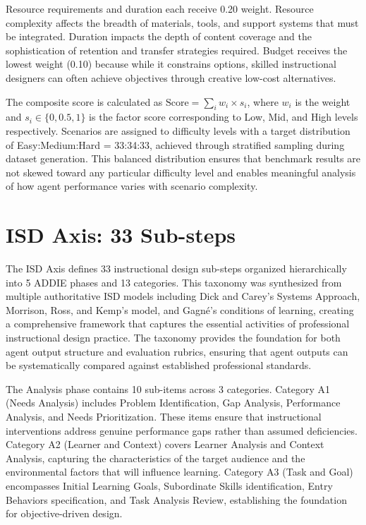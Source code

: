 Resource requirements and duration each receive 0.20 weight. Resource complexity affects the breadth of materials, tools, and support systems that must be integrated. Duration impacts the depth of content coverage and the sophistication of retention and transfer strategies required. Budget receives the lowest weight (0.10) because while it constrains options, skilled instructional designers can often achieve objectives through creative low-cost alternatives.

The composite score is calculated as $\text{Score} = \sum_{i} w_i \times s_i$, where $w_i$ is the weight and $s_i \in \{0, 0.5, 1\}$ is the factor score corresponding to Low, Mid, and High levels respectively. Scenarios are assigned to difficulty levels with a target distribution of Easy:Medium:Hard = 33:34:33, achieved through stratified sampling during dataset generation. This balanced distribution ensures that benchmark results are not skewed toward any particular difficulty level and enables meaningful analysis of how agent performance varies with scenario complexity.

\section{ISD Axis: 33 Sub-steps}
\label{app:isd-axis}

The ISD Axis defines 33 instructional design sub-steps organized hierarchically into 5 ADDIE phases and 13 categories. This taxonomy was synthesized from multiple authoritative ISD models including Dick and Carey's Systems Approach, Morrison, Ross, and Kemp's model, and Gagn\'e's conditions of learning, creating a comprehensive framework that captures the essential activities of professional instructional design practice. The taxonomy provides the foundation for both agent output structure and evaluation rubrics, ensuring that agent outputs can be systematically compared against established professional standards.

The Analysis phase contains 10 sub-items across 3 categories. Category A1 (Needs Analysis) includes Problem Identification, Gap Analysis, Performance Analysis, and Needs Prioritization. These items ensure that instructional interventions address genuine performance gaps rather than assumed deficiencies. Category A2 (Learner and Context) covers Learner Analysis and Context Analysis, capturing the characteristics of the target audience and the environmental factors that will influence learning. Category A3 (Task and Goal) encompasses Initial Learning Goals, Subordinate Skills identification, Entry Behaviors specification, and Task Analysis Review, establishing the foundation for objective-driven design.

